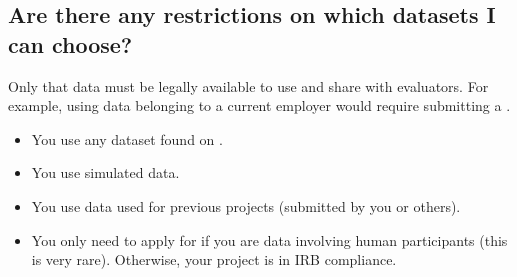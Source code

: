 \documentclass[letterpaper,10pt,english]{jupyterBook}
\begin{document}
\subsection{Are there any restrictions on which datasets I can choose?}
\label{\detokenize{task2_c/task2_part_c:are-there-any-restrictions-on-which-datasets-i-can-choose}}
\sphinxAtStartPar
Only that data must be legally available to use and share with evaluators. For example, using data belonging to a current employer would require submitting a .
\begin{itemize}
\item {} 
\sphinxAtStartPar
You  use any dataset found on .

\item {} 
\sphinxAtStartPar
You  use simulated data.

\item {} 
\sphinxAtStartPar
You  use data used for previous projects (submitted by you or others).

\item {} 
\sphinxAtStartPar
You only need to apply for  if you are  data involving human participants (this is very rare). Otherwise, your project is in IRB compliance.

\end{itemize}
\end{document}
